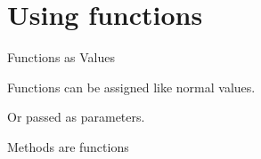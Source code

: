 \section{Using functions}\label{using-functions}

\begin{frame}[fragile]{Functions as Values}

Functions can be assigned like normal values.

\begin{Shaded}
\begin{Highlighting}[]
 
     

\OperatorTok{=} 

\NormalTok{)  }
\end{Highlighting}
\end{Shaded}

\end{frame}

\begin{frame}[fragile]

Or passed as parameters.

\begin{Shaded}
\begin{Highlighting}[]
 
     

\NormalTok{, } \NormalTok{: }\NormalTok{(}\NormalTok{))}
\end{Highlighting}
\end{Shaded}

\end{frame}

\begin{frame}[fragile]{Methods are functions}

\begin{Shaded}
\begin{Highlighting}[]
 \NormalTok{):}
     
         


\OperatorTok{=} 

\NormalTok{)  }
\end{Highlighting}
\end{Shaded}

\end{frame}


